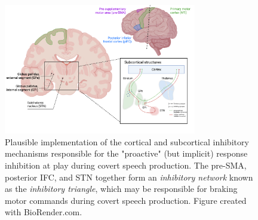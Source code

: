 \documentclass[utf8]{template/frontiersSCNS} %
\begin{document}
\begin{figure}[ht] %
\begin{center}
\includegraphics[width=0.75\textwidth]{figures/inhibitory_triangle.png} %
\end{center}
\caption{Plausible implementation of the cortical and subcortical inhibitory mechanisms responsible for the "proactive" (but implicit) response inhibition at play during covert speech production. The pre-SMA, posterior IFC, and STN together form an \textit{inhibitory network} known as the \textit{inhibitory triangle}, which may be responsible for braking motor commands during covert speech production. Figure created with BioRender.com.}\label{triangle}
\end{figure}

\end{document}
